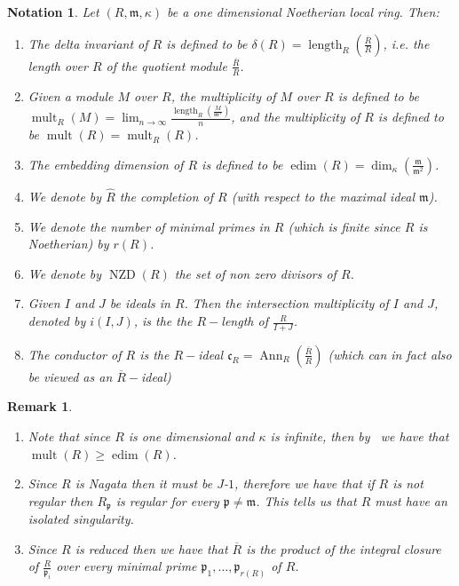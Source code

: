 \documentclass{article}
\newtheorem{notation}[theorem]{Notation}
\newtheorem{remark}[theorem]{Remark}
\DeclareMathOperator{\length}{length}
\DeclareMathOperator{\Ann}{Ann}
\DeclareMathOperator{\edim}{edim}
\DeclareMathOperator{\NZD}{NZD}
\DeclareMathOperator{\mult}{mult}
\numberwithin{theorem}{section}
\begin{document}
\begin{notation}\label{notation:ringstuff}
Let $(R, \mathfrak{m}, \kappa)$ be a one dimensional Noetherian local ring. Then: 
    \begin{enumerate}
        \item The delta invariant of $R$ is defined to be $\delta(R) = \length_R \left( \frac{\overline{R}}{R}\right)$, i.e. the length over $R$ of the quotient module $\frac{\overline{R}}{R}$. 
        \item Given a module $M$ over $R$, the multiplicity of $M$ over $R$ is defined to be $\mult_R(M)=\lim_{n \to \infty} \frac{\length_R\left(\frac{M}{\mathfrak{m}^n}\right)}{n}$, and the multiplicity of $R$ is defined to be $\mult(R)=\mult_R(R)$. 
        \item The embedding dimension of $R$ is defined to be $\edim(R) = \dim_{\kappa} \left( \frac{\mathfrak{m}}{\mathfrak{m}^2}\right)$.
        \item We denote by $\hat{R}$  the completion of $R$ (with respect to the maximal ideal $\mathfrak{m}$).
        \item We denote the number of minimal primes in $R$ (which is finite since $R$ is Noetherian) by $r(R)$.
        \item We denote by $\NZD(R)$ the set of non zero divisors of $R$.
        \item Given $I$ and $J$ be ideals in $R$. Then the intersection multiplicity of $I$ and $J$, denoted by $i(I, J)$, is the  the $R-$length of $\frac{R}{I+J}$. 
        \item The conductor of $R$ is the $R-$ideal $\mathfrak{c}_R=\Ann_R\left(\frac{\overline{R}}{R}\right)$ (which can in fact also be viewed as an $\overline{R}-$ideal)
    \end{enumerate}
\end{notation}

\begin{remark}\label{rem:techincal_ring}
\begin{enumerate}
    \item \textup{Note that since $R$ is one dimensional and $\kappa$ is infinite, then by~\cite{abhyankar1967local} we have that $\mult(R)\geq \edim(R)$.}
    \item \textup{Since $R$ is Nagata then it must be $J$-$1$, therefore we have that if $R$ is not regular then $R_\mathfrak{p}$ is regular for every $\mathfrak{p} \neq \mathfrak{m}$. This tells us that $R$ must have an isolated singularity.  }
    \item \textup{Since $R$ is reduced then we have that $\overline{R}$ is the product of the integral closure of $\frac{R}{\mathfrak{p}_i}$ over every minimal prime $\mathfrak{p}_1, \dots, \mathfrak{p}_{r(R)}$ of $R$.}
\end{enumerate}
\end{remark}
\end{document}
